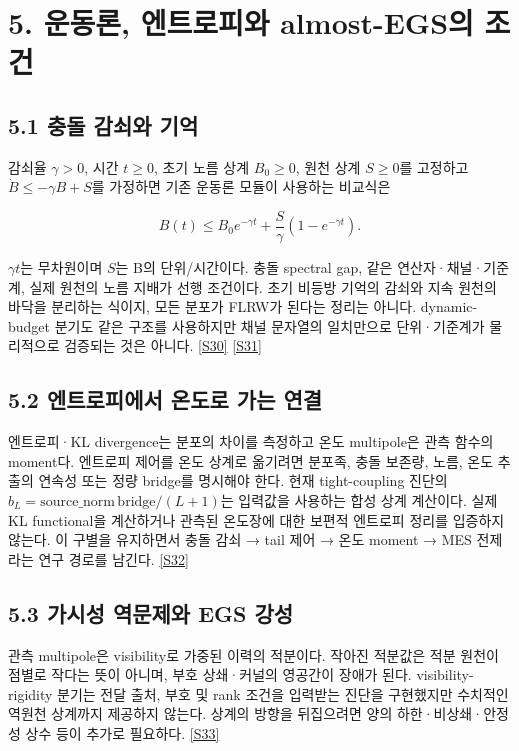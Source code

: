 \documentclass[11pt,a4paper]{article}
\begin{document}
\hypertarget{s5}{}

\section*{5. 운동론, 엔트로피와 almost-EGS의 조건}


\subsection*{5.1 충돌 감쇠와 기억}

감쇠율 \(\gamma>0\), 시간 \(t\ge0\), 초기 노름 상계 \(B_0\ge0\), 원천 상계 \(S\ge0\)를 고정하고 \(\dot B\le-\gamma B+S\)를 가정하면 기존 운동론 모듈이 사용하는 비교식은


\[
B(t)\le B_0e^{-\gamma t}+\frac{S}{\gamma}(1-e^{-\gamma t}).
\]

\(\gamma t\)는 무차원이며 \(S\)는 B의 단위/시간이다. 충돌 spectral gap, 같은 연산자·채널·기준계, 실제 원천의 노름 지배가 선행 조건이다. 초기 비등방 기억의 감쇠와 지속 원천의 바닥을 분리하는 식이지, 모든 분포가 FLRW가 된다는 정리는 아니다. dynamic-budget 분기도 같은 구조를 사용하지만 채널 문자열의 일치만으로 단위·기준계가 물리적으로 검증되는 것은 아니다. \hyperlink{src:S30}{[S30]} \hyperlink{src:S31}{[S31]}


\subsection*{5.2 엔트로피에서 온도로 가는 연결}

엔트로피·KL divergence는 분포의 차이를 측정하고 온도 multipole은 관측 함수의 moment다. 엔트로피 제어를 온도 상계로 옮기려면 분포족, 충돌 보존량, 노름, 온도 추출의 연속성 또는 정량 bridge를 명시해야 한다. 현재 tight-coupling 진단의 \(b_L=\mathrm{source\_norm}\,\mathrm{bridge}/(L+1)\)는 입력값을 사용하는 합성 상계 계산이다. 실제 KL functional을 계산하거나 관측된 온도장에 대한 보편적 엔트로피 정리를 입증하지 않는다. 이 구별을 유지하면서 충돌 감쇠 → tail 제어 → 온도 moment → MES 전제라는 연구 경로를 남긴다. \hyperlink{src:S32}{[S32]}


\subsection*{5.3 가시성 역문제와 EGS 강성}

관측 multipole은 visibility로 가중된 이력의 적분이다. 작아진 적분값은 적분 원천이 점별로 작다는 뜻이 아니며, 부호 상쇄·커널의 영공간이 장애가 된다. visibility-rigidity 분기는 전달 출처, 부호 및 rank 조건을 입력받는 진단을 구현했지만 수치적인 역원천 상계까지 제공하지 않는다. 상계의 방향을 뒤집으려면 양의 하한·비상쇄·안정성 상수 등이 추가로 필요하다. \hyperlink{src:S33}{[S33]}
\end{document}

